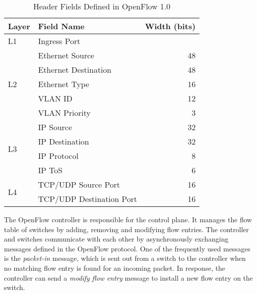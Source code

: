 \begin{table}
\centering
\caption{Header Fields Defined in OpenFlow 1.0}%
\label{tbl:flow-fields}
\begin{tabular}{llr}
\toprule
Layer               & Field Name               & Width (bits) \\ \midrule
L1                  & Ingress Port             &              \\ \cmidrule(rl){2-3}
\multirow{5}{*}{L2} & Ethernet Source          & 48           \\
                    & Ethernet Destination     & 48           \\
                    & Ethernet Type            & 16           \\
                    & VLAN ID                  & 12           \\
                    & VLAN Priority            & 3            \\ \cmidrule(rl){2-3}
\multirow{4}{*}{L3} & IP Source                & 32           \\
                    & IP Destination           & 32           \\
                    & IP Protocol              & 8            \\
                    & IP ToS                   & 6            \\ \cmidrule(rl){2-3}
\multirow{2}{*}{L4} & TCP/UDP Source Port      & 16           \\
                    & TCP/UDP Destination Port & 16           \\ \bottomrule
\end{tabular}
\end{table}

The OpenFlow controller is responsible for the control plane. It manages
the flow table of switches by adding, removing and modifying flow
entries. The controller and switches communicate with each other by
asynchronously exchanging messages defined in the OpenFlow protocol. One
of the frequently used messages is the \emph{packet-in} message, which
is sent out from a switch to the controller when no matching flow entry
is found for an incoming packet. In response, the controller can send a
\emph{modify flow entry} message to install a new flow entry on the
switch.

